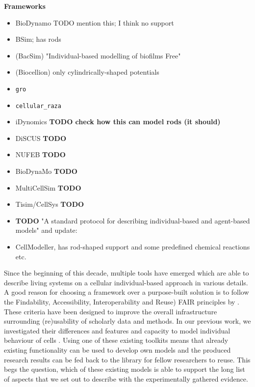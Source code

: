 \documentclass{article}
\begin{document}
\textbf{Frameworks}
\begin{itemize}
    \item \cite{breitwieser_biodynamo_2022} BioDynamo TODO mention this; I think no support
    \item \cite{Gorochowski2012,Matyjaszkiewicz2017} BSim; has rods
    \item \cite{Kreft1998,Kreft2001} (BacSim) "Individual-based modelling of biofilms Free"
    \item \cite{Kang2014} (Biocellion) only cylindrically-shaped potentials
    \item \cite{Gutirrez2017} \texttt{gro}
    \item \cite{Pleyer2025} \texttt{cellular\_raza}
    \item \cite{Bogdanowski2022} iDynomics \textbf{TODO check how this can model rods (it should)}
    \item \cite{GoiMoreno2015} DiSCUS \textbf{TODO}
    \item \cite{Li2019} NUFEB \textbf{TODO}
    \item \cite{Breitwieser2021} BioDynaMo \textbf{TODO}
    \item \cite{Dang2020} MultiCellSim \textbf{TODO}
    \item \cite{Hoehme2010} Tisim/CellSys \textbf{TODO}
    \item \cite{Grimm2006,Grimm2010} \textbf{TODO} "A standard protocol for describing individual-based and
        agent-based models" and update: \cite{Jang2012}
    \item \cite{Rudge2012} CellModeller, has rod-shaped support and some predefined chemical
        reactions etc.
\end{itemize}

Since the beginning of this decade, multiple tools have emerged which are able to describe living
systems on a cellular individual-based approach in various details.
A good reason for choosing a framework over a purpose-built solution is to follow the Findability,
Accessibility, Interoperability and Reuse) FAIR principles by \cite{Wilkinson2016}.
These criteria have been designed to improve the overall infrastructure surrounding (re)usability of
scholarly data and methods.
In our previous work, we investigated their differences and features and capacity to model
individual behaviour of cells \cite{Pleyer2023}.
Using one of these existing toolkits means that already existing functionality can be used to
develop own models and the produced research results can be fed back to the library for fellow
researchers to reuse.
This begs the question, which of these existing models is able to support the long list of aspects
that we set out to describe with the experimentally gathered evidence.
\end{document}
